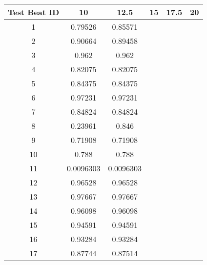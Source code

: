 \begin{tabular}{|c|c|c|c|c|c|}
\hline 
Test Beat ID & 10 & 12.5 & 15 & 17.5 & 20 \\ 
\hline 
1 & 0.79526 & 0.85571 &  &  &  \\ 
2 & 0.90664 & 0.89458 &  &  &  \\ 
3 & 0.962 & 0.962 &  &  &  \\ 
4 & 0.82075 & 0.82075 &  &  &  \\ 
5 & 0.84375 & 0.84375 &  &  &  \\ 
6 & 0.97231 & 0.97231 &  &  &  \\ 
7 & 0.84824 & 0.84824 &  &  &  \\ 
8 & 0.23961 & 0.846 &  &  &  \\ 
9 & 0.71908 & 0.71908 &  &  &  \\ 
10 & 0.788 & 0.788 &  &  &  \\ 
11 & 0.0096303 & 0.0096303 &  &  &  \\ 
12 & 0.96528 & 0.96528 &  &  &  \\ 
13 & 0.97667 & 0.97667 &  &  &  \\ 
14 & 0.96098 & 0.96098 &  &  &  \\ 
15 & 0.94591 & 0.94591 &  &  &  \\ 
16 & 0.93284 & 0.93284 &  &  &  \\ 
17 & 0.87744 & 0.87514 &  &  &  \\ 
\hline 
\end{tabular}